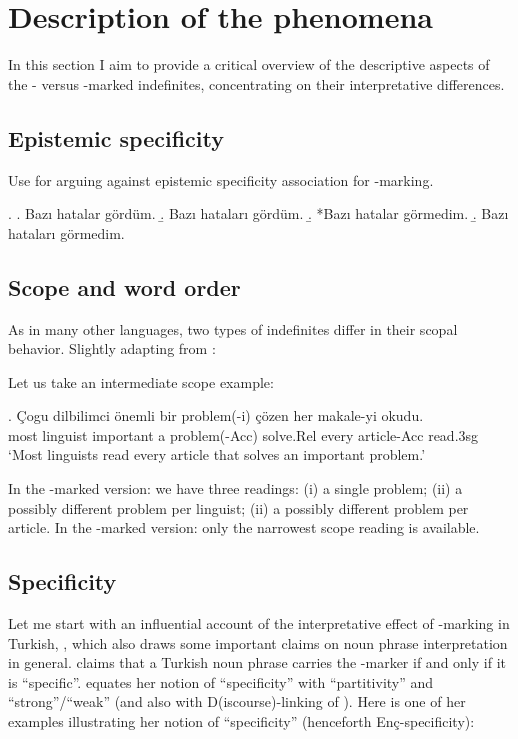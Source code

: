 \documentclass[11pt,a4paper]{article}
\newcommand{\encspec}{Enç-specific}
\begin{document}
\section{Description of the phenomena}

In this section I aim to provide a critical overview of the
descriptive aspects of the \acc- versus \zero-marked indefinites,
concentrating on their interpretative differences.

\subsection{Epistemic specificity}

Use  for arguing against epistemic specificity
association for \acc-marking.


\ex.
\a. Bazı hatalar gördüm.
\b. Bazı hataları gördüm.
\b. *Bazı hatalar görmedim.
\b. Bazı hataları görmedim.


\subsection{Scope and word order}
\label{scscope}

As in many other languages, two types of indefinites differ in their
scopal behavior. Slightly adapting from :

Let us take an intermediate scope example:

\exg. Çogu dilbilimci önemli bir problem(-i) çözen her makale-yi okudu.\\
most linguist important a problem(-Acc) solve.Rel every article-Acc read.3sg\\
`Most linguists read every article that solves an important problem.'

In the \acc-marked version: we have three readings: (i) a single
problem; (ii) a possibly different problem per linguist; (ii) a
possibly different problem per article. In the \zero-marked version:
only the narrowest scope reading is available.



\subsection{Specificity} %
\label{scenc}

Let me start with an influential account of the interpretative effect
of \acc-marking in Turkish, , which also draws some
important claims on noun phrase interpretation in general.
 claims that a Turkish noun phrase carries the \acc-marker
if and only if it is ``specific''.  equates her notion of
``specificity'' with ``partitivity'' and ``strong''/``weak'' (and also with
D(iscourse)-linking of ). Here is one of her examples
illustrating her notion of ``specificity'' (henceforth \encspec ity):
\end{document}
